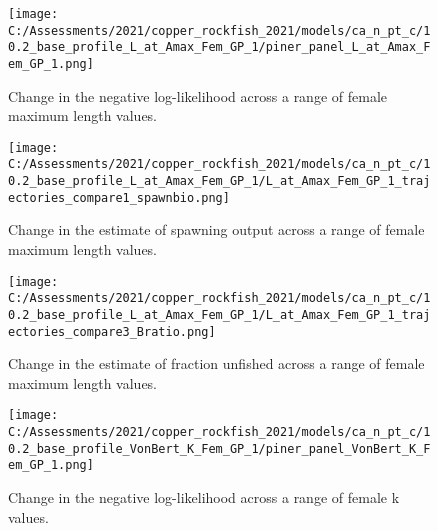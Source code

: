 \documentclass[11pt,
  english,
  a4paper,
]{article}
\begin{document}
\tagmcend\tagstructend


\begin{figure}
\centering
\texttt{[image: C:/Assessments/2021/copper\_rockfish\_2021/models/ca\_n\_pt\_c/10.2\_base\_profile\_L\_at\_Amax\_Fem\_GP\_1/piner\_panel\_L\_at\_Amax\_Fem\_GP\_1.png]}
\caption{Change in the negative log-likelihood across a range of female maximum length values.\label{fig:linf-profile}}
\end{figure}

\tagmcend\tagstructend


\begin{figure}
\centering
\texttt{[image: C:/Assessments/2021/copper\_rockfish\_2021/models/ca\_n\_pt\_c/10.2\_base\_profile\_L\_at\_Amax\_Fem\_GP\_1/L\_at\_Amax\_Fem\_GP\_1\_trajectories\_compare1\_spawnbio.png]}
\caption{Change in the estimate of spawning output across a range of female maximum length values.\label{fig:linf-ssb}}
\end{figure}

\tagmcend\tagstructend


\begin{figure}
\centering
\texttt{[image: C:/Assessments/2021/copper\_rockfish\_2021/models/ca\_n\_pt\_c/10.2\_base\_profile\_L\_at\_Amax\_Fem\_GP\_1/L\_at\_Amax\_Fem\_GP\_1\_trajectories\_compare3\_Bratio.png]}
\caption{Change in the estimate of fraction unfished across a range of female maximum length values.\label{fig:linf-depl}}
\end{figure}

\tagmcend\tagstructend


\begin{figure}
\centering
\texttt{[image: C:/Assessments/2021/copper\_rockfish\_2021/models/ca\_n\_pt\_c/10.2\_base\_profile\_VonBert\_K\_Fem\_GP\_1/piner\_panel\_VonBert\_K\_Fem\_GP\_1.png]}
\caption{Change in the negative log-likelihood across a range of female k values.\label{fig:k-profile}}
\end{figure}
\end{document}
